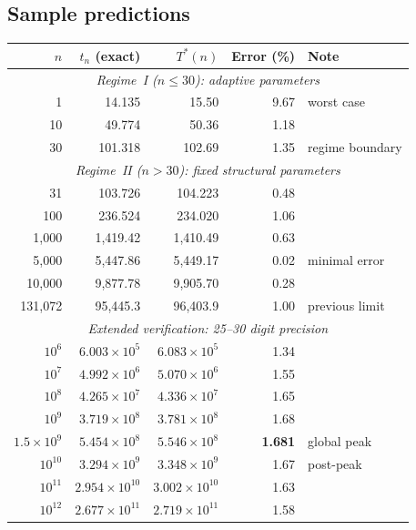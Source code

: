 \subsection{Sample predictions}\label{ssec:predictions}

\begin{center}
\begin{tabular}{rrrrl}
\toprule
$n$ & $t_n$ (exact) & $T^*(n)$ & Error (\%) & Note \\
\midrule
\multicolumn{5}{c}{\emph{Regime~I ($n \le 30$): adaptive parameters}} \\
1     & 14.135   & 15.50    & 9.67  & worst case \\
10    & 49.774   & 50.36    & 1.18  & \\
30    & 101.318  & 102.69   & 1.35  & regime boundary \\
\midrule
\multicolumn{5}{c}{\emph{Regime~II ($n > 30$): fixed structural parameters}} \\
31        & 103.726   & 104.223   & 0.48 & \\
100       & 236.524   & 234.020   & 1.06 & \\
1{,}000   & 1{,}419.42 & 1{,}410.49 & 0.63 & \\
5{,}000   & 5{,}447.86 & 5{,}449.17 & 0.02 & minimal error \\
10{,}000  & 9{,}877.78 & 9{,}905.70 & 0.28 & \\
131{,}072 & 95{,}445.3 & 96{,}403.9 & 1.00 & previous limit \\
\midrule
\multicolumn{5}{c}{\emph{Extended verification: 25--30 digit precision}} \\
$10^6$        & $6.003 \times 10^5$  & $6.083 \times 10^5$  & 1.34 & \\
$10^7$        & $4.992 \times 10^6$  & $5.070 \times 10^6$  & 1.55 & \\
$10^8$        & $4.265 \times 10^7$  & $4.336 \times 10^7$  & 1.65 & \\
$10^9$        & $3.719 \times 10^8$  & $3.781 \times 10^8$  & 1.68 & \\
$1.5\times 10^9$ & $5.454 \times 10^8$ & $5.546 \times 10^8$ & \textbf{1.681} & global peak \\
$10^{10}$     & $3.294 \times 10^9$  & $3.348 \times 10^9$  & 1.67 & post-peak \\
$10^{11}$     & $2.954 \times 10^{10}$ & $3.002 \times 10^{10}$ & 1.63 & \\
$10^{12}$     & $2.677 \times 10^{11}$ & $2.719 \times 10^{11}$ & 1.58 & \\
\bottomrule
\end{tabular}
\end{center}

